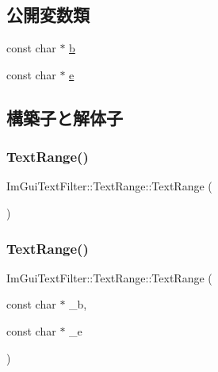 \subsection*{公開変数類}
\begin{DoxyCompactItemize}
\item 
const char $\ast$ \mbox{\hyperlink{struct_im_gui_text_filter_1_1_text_range_a705cf9c8fb0796b3bab9cf20cb18b0ca}{b}}
\item 
const char $\ast$ \mbox{\hyperlink{struct_im_gui_text_filter_1_1_text_range_a20daef0e47167d49a017d8f54cb7c607}{e}}
\end{DoxyCompactItemize}


\subsection{構築子と解体子}
\mbox{\label{struct_im_gui_text_filter_1_1_text_range_a5a6548fd40884ef5837e6a1ffa33af61}} 
\subsubsection{\texorpdfstring{Text\+Range()}{TextRange()}\hspace{0.1cm}{\footnotesize\ttfamily [1/2]}}
{\footnotesize\ttfamily Im\+Gui\+Text\+Filter\+::\+Text\+Range\+::\+Text\+Range (\begin{DoxyParamCaption}{ }\end{DoxyParamCaption})\hspace{0.3cm}{\ttfamily [inline]}}

\mbox{\label{struct_im_gui_text_filter_1_1_text_range_a4a2b377d4fd141fc3664378041f9f007}} 
\subsubsection{\texorpdfstring{Text\+Range()}{TextRange()}\hspace{0.1cm}{\footnotesize\ttfamily [2/2]}}
{\footnotesize\ttfamily Im\+Gui\+Text\+Filter\+::\+Text\+Range\+::\+Text\+Range (\begin{DoxyParamCaption}\item[{const char $\ast$}]{\+\_\+b,  }\item[{const char $\ast$}]{\+\_\+e }\end{DoxyParamCaption})\hspace{0.3cm}{\ttfamily [inline]}}



